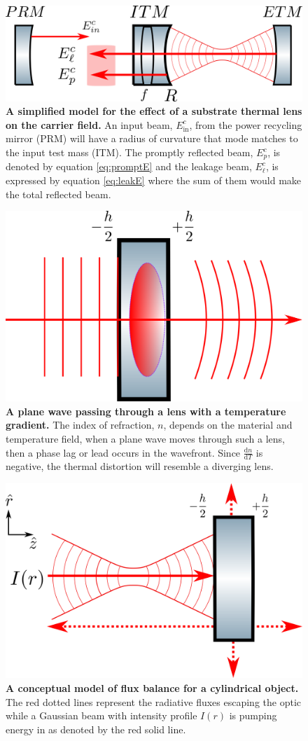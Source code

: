 


\begin{figure}[ht]
	\centering
	\includegraphics[width=.7 \textwidth]{../Figures/ThermalLensFP.png}
	\caption[A simplified model for the effect of a substrate thermal lens on the carrier field.]  
	{\textbf{A simplified model for the effect of a substrate thermal lens on the carrier field.} An input beam, $E_{\text{in}}^{c}$, from the power recycling mirror (PRM) will have a radius of curvature that mode matches to the input test mass (ITM).  The promptly reflected beam, $E_{p}^{c}$, is denoted by equation \ref{eq:promptE} and the leakage beam, $E_{\ell}^{c}$, is expressed by equation \ref{eq:leakE} where the sum of them would make the total reflected beam.}
	\label{fig:ThermalLensFP}
\end{figure}

\begin{figure}[ht]
	\centering
	\includegraphics[width=.4 \textwidth]{../Figures/ThermalLensWF.png}
	\caption[A plane wave passing through a lens with a temperature gradient.]  
	{\textbf{A plane wave passing through a lens with a temperature gradient.} The index of refraction, $n$, depends on the material and temperature field, when a plane wave moves through such a lens, then a phase lag or lead occurs in the wavefront. Since $\frac{\text{d}n}{\text{d}T}$ is negative, the thermal distortion will resemble a diverging lens.}
	\label{fig:ThermalLensWF}
\end{figure}

\begin{figure}[ht]
	\centering
	\includegraphics[width=.6 \textwidth]{../Figures/ThermalLensFlux.png}
	\caption[A conceptual model of flux balance for a cylindrical object.]  
	{\textbf{A conceptual model of flux balance for a cylindrical object.} The red dotted lines represent the radiative fluxes escaping the optic while a Gaussian beam with intensity profile $I(r)$ is pumping energy in as denoted by the red solid line.}
	\label{fig:ThermalLensFlux}
\end{figure}

